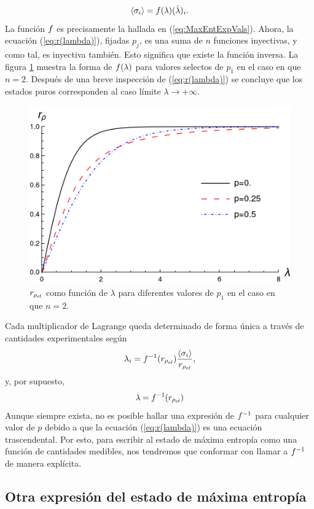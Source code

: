 \begin{equation}
    \expval{\sigma_{i}}=f(\lambda)(\hat{\lambda})_{i}.
\end{equation}
La función $f$ es precisamente la hallada en (\ref{eq:MaxEntExpVals}). Ahora, la ecuación (\ref{eq:r(lambda)}), fijadas $p_{j}$, es una suma de $n$ funciones inyectivas, y como tal, es inyectiva también. Esto significa que existe la función inversa. La figura \ref{fig:r(lambda)} muestra la forma de $f(\lambda)$ para valores selectos de $p_{1}$ en el caso en que $n=2$. Después de una breve inspección de (\ref{eq:r(lambda)}) se concluye que los estados puros corresponden al caso límite $\lambda\rightarrow+\infty$.

\begin{figure}[ht]
    \centering
    \includegraphics[width=0.6\linewidth]{chapter2/figures/r(lambda).png}
    \caption{$r_{\rho_{\text{ef}}}$ como función de $\lambda$ para diferentes valores de $p_{1}$ en el caso en que $n=2$.}
    \label{fig:r(lambda)}
\end{figure}
Cada multiplicador de Lagrange queda determinado de forma única a través de cantidades experimentales según 
\begin{equation}
    \lambda_{i}=f^{-1}(r_{\rho_{\text{ef}}}) \frac{\expval{\sigma_{i}}}{r_{\rho_{\text{ef}}}},
\end{equation}
y, por supuesto,
\begin{equation*}
    \lambda=f^{-1}(r_{\rho_{\text{ef}}})
\end{equation*}
Aunque siempre exista, no es posible hallar una expresión de $f^{-1}$ para cualquier valor de $p$ debido a que la ecuación (\ref{eq:r(lambda)}) es una ecuación trascendental. Por esto, para escribir al estado de máxima entropía como una función de cantidades medibles, nos tendremos que conformar con llamar a $f^{-1}$ de manera explícita.

\subsection{Otra expresión del estado de máxima entropía}

